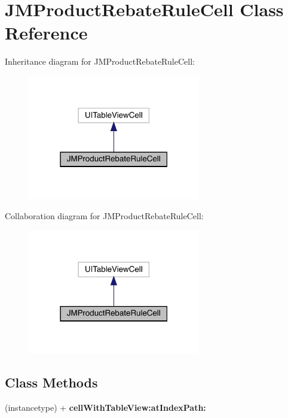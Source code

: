 \hypertarget{interface_j_m_product_rebate_rule_cell}{}\section{J\+M\+Product\+Rebate\+Rule\+Cell Class Reference}
\label{interface_j_m_product_rebate_rule_cell}


Inheritance diagram for J\+M\+Product\+Rebate\+Rule\+Cell\+:\nopagebreak
\begin{figure}[H]
\begin{center}
\leavevmode
\includegraphics[width=214pt]{interface_j_m_product_rebate_rule_cell__inherit__graph}
\end{center}
\end{figure}


Collaboration diagram for J\+M\+Product\+Rebate\+Rule\+Cell\+:\nopagebreak
\begin{figure}[H]
\begin{center}
\leavevmode
\includegraphics[width=214pt]{interface_j_m_product_rebate_rule_cell__coll__graph}
\end{center}
\end{figure}
\subsection*{Class Methods}
\begin{DoxyCompactItemize}
\item 
\mbox{\label{interface_j_m_product_rebate_rule_cell_a4da4be4f1029e72696ef27d639bb547e}} 
(instancetype) + {\bfseries cell\+With\+Table\+View\+:at\+Index\+Path\+:}
\end{DoxyCompactItemize}
